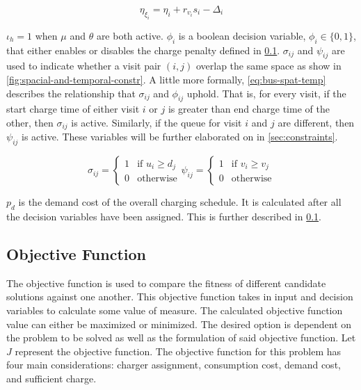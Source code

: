 \documentclass[11pt,a4paper,final]{article}
\begin{document}
\begin{equation}
\label{eq:bat-chain}
  \eta_{\xi_i} = \eta_i + r_{v_i}s_i - \Delta_i
\end{equation}

\(\iota_h = 1\) when \(\mu\) and \(\theta\) are both active. \(\phi_i\) is a boolean decision variable, \(\phi_i \in \{0,1\}\),
that either enables or disables the charge penalty defined in \ref{sec:objective-function}. \(\sigma_{ij}\) and \(\psi_{ij}\) are
used to indicate whether a visit pair \((i, j)\) overlap the same space as show in \ref{fig:spacial-and-temporal-constr}. A
little more formally, \ref{eq:bus-spat-temp} describes the relationship that \(\sigma_{ij}\) and \(\phi_{ij}\) uphold. That is,
for every visit, if the start charge time of either visit \(i\) or \(j\) is greater than end charge time of the other, then
\(\sigma_{ij}\) is active. Similarly, if the queue for visit \(i\) and \(j\) are different, then \(\psi_{ij}\) is active. These
variables will be further elaborated on in \ref{sec:constraints}.

\begin{subequations}
\label{eq:bus-spat-temp}

\begin{equation}
  \sigma_{ij} =
  \begin{cases}
    1 & \text{if } u_i \ge d_j \\
    0 & \text{otherwise}
  \end{cases}
\end{equation}

\begin{equation}
  \psi_{ij} =
  \begin{cases}
    1 & \text{if } v_i \ge v_j \\
    0 & \text{otherwise}
  \end{cases}
\end{equation}

\end{subequations}

\(p_d\) is the demand cost of the overall charging schedule. It is calculated after all the decision variables have been
assigned. This is further described in \ref{sec:objective-function}.

\subsection{Objective Function}
\label{sec:objective-function}
The objective function is used to compare the fitness of different candidate solutions against one another. This
objective function takes in input and decision variables to calculate some value of measure. The calculated objective
function value can either be maximized or minimized. The desired option is dependent on the problem to be solved as well
as the formulation of said objective function. Let \(J\) represent the objective function. The objective function for this
problem has four main considerations: charger assignment, consumption cost, demand cost, and sufficient charge.
\end{document}

